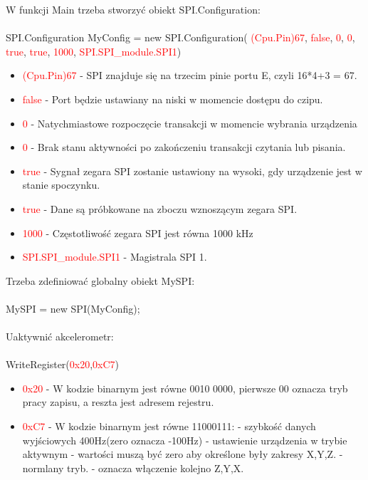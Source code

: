 \documentclass{article}
\begin{document}
W funkcji Main trzeba stworzyć obiekt SPI.Configuration:\\\\
SPI.Configuration MyConfig =
new SPI.Configuration(\space \textcolor{red}{ (Cpu.Pin)67},\space \textcolor{red}{ false},\space \textcolor{red}{ 0}, \space \textcolor{red}{ 0},\space \textcolor{red}{ true},\space \textcolor{red}{ true},\space \textcolor{red}{ 1000},\space \textcolor{red}{ SPI.SPI\_module.SPI1})
\begin{itemize}
\item \textcolor{red}{(Cpu.Pin)67} - SPI znajduje się na trzecim pinie portu E, czyli 16*4+3 = 67.
\item \textcolor{red}{false} - Port będzie ustawiany na niski w momencie dostępu do czipu.
\item \textcolor{red}{0} - Natychmiastowe rozpoczęcie transakcji w momencie wybrania urządzenia
\item \textcolor{red}{0} - Brak stanu aktywności po zakończeniu transakcji czytania lub pisania.
\item \textcolor{red}{true} - Sygnał zegara SPI zostanie ustawiony na wysoki, gdy urządzenie jest w stanie spoczynku.
\item \textcolor{red}{true} -  Dane są próbkowane na zboczu wznoszącym zegara SPI.
\item \textcolor{red}{1000} -  Częstotliwość zegara SPI jest równa 1000 kHz
\item \textcolor{red}{SPI.SPI\_module.SPI1} - Magistrala SPI 1. 
\end{itemize}
Trzeba zdefiniować globalny obiekt MySPI:\\\\
MySPI = new SPI(MyConfig);\\\\
Uaktywnić akcelerometr:\\\\
WriteRegister(\space \textcolor{red}{0x20},\space \textcolor{red}{0xC7})
\begin{itemize}
\item \textcolor{red}{0x20} -  W kodzie binarnym jest równe 0010 0000, pierwsze 00 oznacza tryb pracy zapisu, a reszta jest adresem rejestru.
\item \textcolor{red}{0xC7} -  W kodzie binarnym jest równe 11000111: 
 - szybkość danych wyjściowych 400Hz(zero oznacza -100Hz)
 - ustawienie urządzenia w trybie aktywnym
 - wartości muszą być zero aby określone były zakresy X,Y,Z.
 - normlany tryb.
 - oznacza włączenie kolejno Z,Y,X.
\end{itemize}
\end{document}
